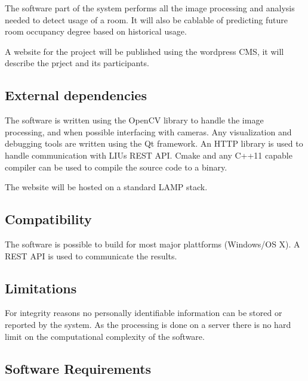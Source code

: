 The software part of the system performs all the image processing and analysis needed to detect usage of a room. It will also be cablable of predicting future room occupancy degree based on historical usage. 

A website for the project will be published using the wordpress CMS, it will describe the prject and its participants.
 
\subsection{External dependencies}
The software is written using the OpenCV library to handle the image processing, and when possible interfacing with cameras. 
Any visualization and debugging tools are written using the Qt framework. 
An HTTP library is used to handle communication with LIUs REST API.
Cmake and any C++11 capable compiler can be used to compile the source code to a binary.

The website will be hosted on a standard LAMP stack.

\subsection{Compatibility}
The software is possible to build for most major plattforms (Windows/OS X). A REST API is used to communicate the results.

\subsection{Limitations}
For integrity reasons no personally identifiable information can be stored or reported by the system. As the processing is done on a server there is no hard limit on the computational complexity of the software.

\subsection{Software Requirements}
\label{sec:software_req}
\reqtable
{	
}